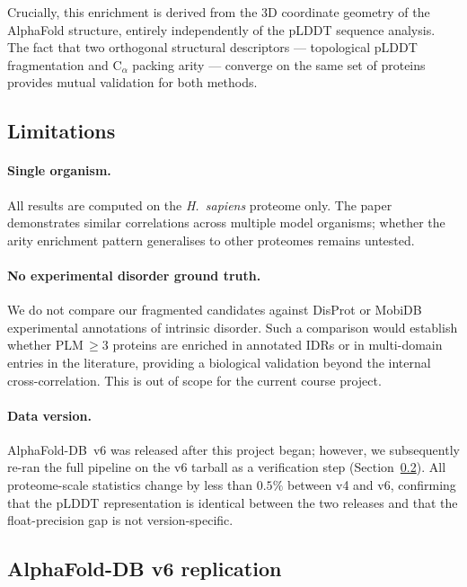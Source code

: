 Crucially, this enrichment is derived from the 3D coordinate geometry
of the AlphaFold structure, entirely independently of the pLDDT
sequence analysis.
The fact that two orthogonal structural descriptors --- topological
pLDDT fragmentation and $\mathrm{C}_\alpha$ packing arity --- converge
on the same set of proteins provides mutual validation for both methods.

\subsection{Limitations}
\label{sec:disc_limits}

\paragraph{Single organism.}
All results are computed on the \textit{H.~sapiens} proteome only.
The paper demonstrates similar correlations across multiple model
organisms; whether the arity enrichment pattern generalises to other
proteomes remains untested.

\paragraph{No experimental disorder ground truth.}
We do not compare our fragmented candidates against DisProt or MobiDB
experimental annotations of intrinsic disorder.
Such a comparison would establish whether PLM$\,\geq 3$ proteins are
enriched in annotated IDRs or in multi-domain entries in the literature,
providing a biological validation beyond the internal cross-correlation.
This is out of scope for the current course project.

\paragraph{Data version.}
AlphaFold-DB~v6 was released after this project began; however, we
subsequently re-ran the full pipeline on the v6 tarball as a verification
step (Section~\ref{sec:disc_v6}).
All proteome-scale statistics change by less than $0.5\%$ between v4 and v6,
confirming that the pLDDT representation is identical between the two releases
and that the float-precision gap is not version-specific.

\subsection{AlphaFold-DB v6 replication}
\label{sec:disc_v6}

